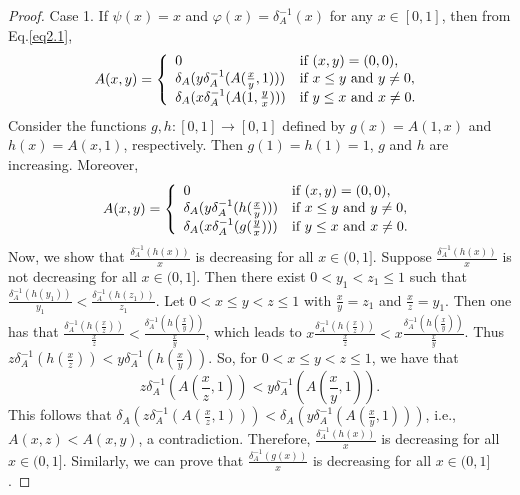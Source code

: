 \documentclass[12pt]{article}
\begin{document}
\begin{proof}
Case 1. If $\psi(x)=x$ and $\varphi(x)=\delta_{A}^{-1}(x)$ for any $x\in [0, 1]$, then from Eq.\eqref{eq2.1},
$$A(x,y)=\left\{\begin{array}{ll}
0 & {\mbox{\scriptsize\normalsize if  } (x,y)=(0,0)},\\
\delta_{A}(y\delta_{A}^{-1}(A(\frac{x}{y},1))) & {\mbox{\scriptsize\normalsize if  } x\leq y \mbox{ and }y\neq0},\\
\delta_{A}(x\delta_{A}^{-1}(A(1,\frac{y}{x}))) & {\mbox{\scriptsize\normalsize if  } y\leq x \mbox{ and }x\neq0}.
\end{array}
\right.$$
Consider the functions $g,h:[0, 1] \rightarrow[0, 1]$ defined by $g(x)=A(1,x)$ and $h(x)=A(x,1)$, respectively. Then $g(1)=h(1)=1$, $g$ and $h$ are increasing. Moreover, $$A(x,y)=\left\{\begin{array}{ll}
0 & {\mbox{\scriptsize\normalsize if  } (x,y)=(0,0)},\\
\delta_{A}(y\delta_{A}^{-1}(h(\frac{x}{y}))) & {\mbox{\scriptsize\normalsize if  } x\leq y \mbox{ and }y\neq0},\\
\delta_{A}(x\delta_{A}^{-1}(g(\frac{y}{x}))) & {\mbox{\scriptsize\normalsize if  } y\leq x \mbox{ and }x\neq0}.
\end{array}
\right.$$
Now, we show that $\frac {\delta_{A}^{-1}(h(x))}{x}$ is decreasing for all $x\in(0, 1]$. Suppose $\frac {\delta_{A}^{-1}(h(x))}{x}$ is not decreasing for all $x\in(0, 1]$. Then there exist  $0<y_{1}<z_{1}\leq 1 $ such that $\frac {\delta_{A}^{-1}(h(y_{1}))}{y_{1}}<\frac {\delta_{A}^{-1}(h(z_{1}))}{z_{1}}$. Let $0<x\leq y<z\leq 1$ with $\frac {x}{y}=z_{1}$ and $\frac {x}{z}=y_{1}$. Then one has that $\frac {\delta_{A}^{-1}(h(\frac {x}{z}))}{\frac {x}{z}}<\frac {\delta_{A}^{-1}(h(\frac {x}{y}))}{\frac {x}{y}}$, which leads to $x\frac {\delta_{A}^{-1}(h(\frac {x}{z}))}{\frac {x}{z}}<x\frac {\delta_{A}^{-1}(h(\frac {x}{y}))}{\frac {x}{y}}$. Thus $z\delta_{A}^{-1}(h(\frac {x}{z}))<y\delta_{A}^{-1}(h(\frac {x}{y}))$.
So, for $0<x\leq y<z\leq 1$, we have that
$$z\delta_{A}^{-1}(A(\frac {x}{z},1))<y\delta_{A}^{-1}(A(\frac {x}{y},1)).$$
This follows that $\delta_{A}(z\delta_{A}^{-1}(A(\frac {x}{z},1)))<\delta_{A}(y\delta_{A}^{-1}(A(\frac {x}{y},1)))$, i.e., $A(x,z)<A(x,y)$, a contradiction. Therefore, $\frac {\delta_{A}^{-1}(h(x))}{x}$ is decreasing for all $x\in(0, 1]$. Similarly, we can prove that $\frac {\delta_{A}^{-1}(g(x))}{x}$ is decreasing for all $x\in(0, 1]$.


\end{proof}
\end{document}
